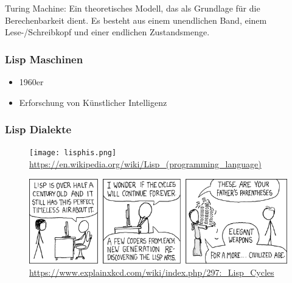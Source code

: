 \documentclass{beamer}
\begin{document}
\begin{frame}

\textmd{Turing Machine: Ein theoretisches Modell, das als Grundlage für die Berechenbarkeit dient. Es besteht aus einem unendlichen Band, einem Lese-/Schreibkopf und einer endlichen Zustandsmenge.}



\end{frame}

\begin{frame}
\frametitle{Lisp Maschinen}
	\begin{itemize}
            \item 1960er
            \item Erforschung von Künstlicher Intelligenz
	\end{itemize}

\end{frame}

\begin{frame}
\frametitle{Lisp Dialekte}
	\begin{figure}
	    \centering
	    \texttt{[image: lisphis.png]}
            \textmd{ \tiny \url{https://en.wikipedia.org/wiki/Lisp_(programming_language)}}
	\end{figure}
\end{frame}



\begin{frame}
	\begin{figure}
	    \centering
	    \includegraphics[width=1\linewidth]{bilder/lisp_cycles.png}
        \textmd{ \tiny \url{https://www.explainxkcd.com/wiki/index.php/297:_Lisp_Cycles}}
	\end{figure}
\end{frame}
\end{document}
